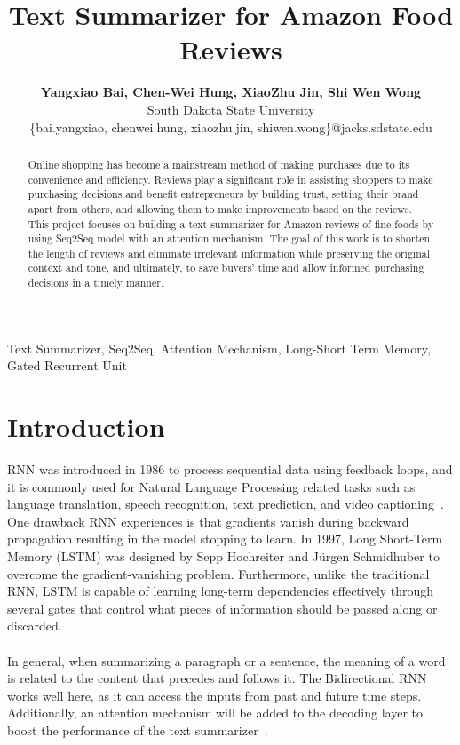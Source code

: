 \documentclass[conference]{IEEEtran}
\begin{document}
\title{\textbf{Text Summarizer for Amazon Food Reviews}\\}
\author{\textbf{\Large{Yangxiao Bai, Chen-Wei Hung, XiaoZhu Jin, Shi Wen Wong}} \\
South Dakota State University \\
\{bai.yangxiao, chenwei.hung, xiaozhu.jin, shiwen.wong\}@jacks.sdstate.edu \\
}

\maketitle

\begin{abstract}
Online shopping has become a mainstream method of making purchases due to its convenience and efficiency. Reviews play a significant role in assisting shoppers to make purchasing decisions and benefit entrepreneurs by building trust, setting their brand apart from others, and allowing them to make improvements based on the reviews. This project focuses on building a text summarizer for Amazon reviews of fine foods by using Seq2Seq model with an attention mechanism. The goal of this work is to shorten the length of reviews and eliminate irrelevant information while preserving the original context and tone, and ultimately, to save buyers’ time and allow informed purchasing decisions in a timely manner. 
\end{abstract} 

\begin{IEEEkeywords}
Text Summarizer, Seq2Seq, Attention Mechanism, Long-Short Term Memory, Gated Recurrent Unit
\end{IEEEkeywords}

\section{Introduction}
RNN was introduced in 1986 to process sequential data using feedback loops, and it is commonly used for Natural Language Processing related tasks such as language translation, speech recognition, text prediction, and video captioning~\cite{staudemeyer2019understanding}. One drawback RNN experiences is that gradients vanish during backward propagation resulting in the model stopping to learn. In 1997, Long Short-Term Memory (LSTM) was designed by Sepp Hochreiter and J\"{u}rgen Schmidhuber to overcome the gradient-vanishing problem. Furthermore, unlike the traditional RNN, LSTM is capable of learning long-term dependencies effectively through several gates that control what pieces of information should be passed along or discarded. \\ \\
\indent In general, when summarizing a paragraph or a sentence, the meaning of a word is related to the content that precedes and follows it. The Bidirectional RNN works well here, as it can access the inputs from past and future time steps. Additionally, an attention mechanism will be added to the decoding layer to boost the performance of the text summarizer~\cite{vaswani2017attention}. 
\end{document}
